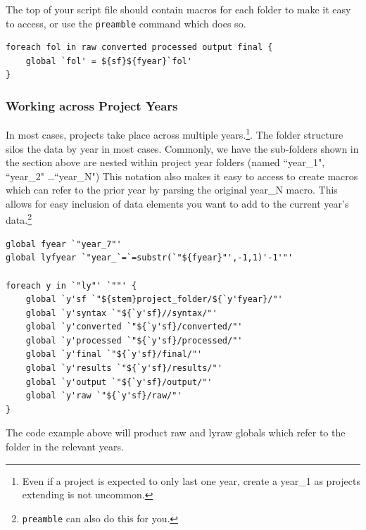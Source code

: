 The top of your script file should contain macros for each folder to make it easy to access, or use the \texttt{preamble} command which does so.
\begin{lstlisting}
foreach fol in raw converted processed output final {
	global `fol' = ${sf}${fyear}`fol'
}
\end{lstlisting}

\subsubsection{Working across Project Years} In most cases, projects take place across multiple years.\footnote{Even if a project is expected to only last one year, create a year\_1 as projects extending is not uncommon.}. The folder structure silos the data by year in most cases. Commonly, we have the sub-folders shown in the section above are nested within project year folders (named ``year\_1", ``year\_2" \ldots ``year\_N")  This notation also makes it easy to access to create macros which can refer to the prior year by parsing the original year\_N macro. This allows for easy inclusion of data elements you want to add to the current year\rq{}s data.\footnote{\texttt{preamble} can also do this for you.}

\begin{lstlisting}
global fyear `"year_7"'
global lyfyear `"year_`=`=substr(`"${fyear}"',-1,1)'-1'"'

foreach y in `"ly"' `""' {
	global `y'sf `"${stem}project_folder/${`y'fyear}/"'
	global `y'syntax `"${`y'sf}//syntax/"'
	global `y'converted `"${`y'sf}/converted/"'
	global `y'processed `"${`y'sf}/processed/"'
	global `y'final `"${`y'sf}/final/"'
	global `y'results `"${`y'sf}/results/"'
	global `y'output `"${`y'sf}/output/"'
	global `y'raw `"${`y'sf}/raw/"'
}
\end{lstlisting}

The code example above will product raw and lyraw globals which refer to the folder in the relevant years.

